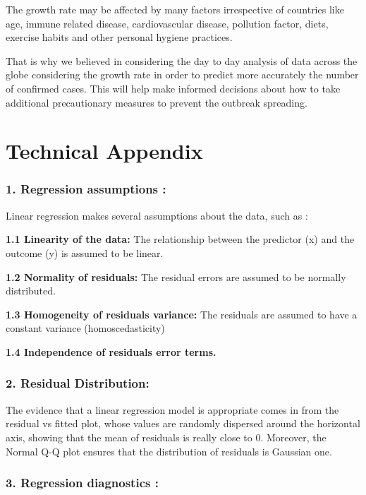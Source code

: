 \documentclass[11pt]{article}
\begin{document}
The growth rate may be affected by many factors irrespective of
countries like age, immune related disease, cardiovascular disease,
pollution factor, diets, exercise habits and other personal hygiene
practices.

That is why we believed in considering the day to day analysis of data
across the globe considering the growth rate in order to predict more
accurately the number of confirmed cases. This will help make informed
decisions about how to take additional precautionary measures to prevent
the outbreak spreading.

\hypertarget{technical-appendix}{%
\section{Technical Appendix}\label{technical-appendix}}

\hypertarget{regression-assumptions}{%
\subsubsection{1. Regression assumptions
:}\label{regression-assumptions}}

Linear regression makes several assumptions about the data, such as :

\textbf{1.1 Linearity of the data:} The relationship between the
predictor (x) and the outcome (y) is assumed to be linear.

\textbf{1.2 Normality of residuals:} The residual errors are assumed to
be normally distributed.

\textbf{1.3 Homogeneity of residuals variance:} The residuals are
assumed to have a constant variance (homoscedasticity)

\textbf{1.4 Independence of residuals error terms.}

\hypertarget{residual-distribution}{%
\subsubsection{2. Residual Distribution:}\label{residual-distribution}}

The evidence that a linear regression model is appropriate comes in from
the residual vs fitted plot, whose values are randomly dispersed around
the horizontal axis, showing that the mean of residuals is really close
to 0. Moreover, the Normal Q-Q plot ensures that the distribution of
residuals is Gaussian one.

\hypertarget{regression-diagnostics}{%
\subsubsection{3. Regression diagnostics
:}\label{regression-diagnostics}}
\end{document}
